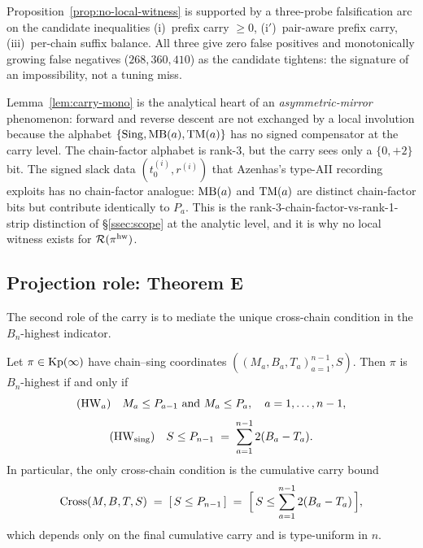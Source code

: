 Proposition~\ref{prop:no-local-witness} is supported by a three-probe falsification
arc on the candidate inequalities (i)~prefix carry $\ge 0$, (i$'$)~pair-aware
prefix carry, (iii)~per-chain suffix balance. All three give zero false positives
and monotonically growing false negatives ($268, 360, 410$) as the candidate
tightens: the signature of an impossibility, not a tuning miss.

\begin{remark}\label{rmk:asymmetric-mirror}
Lemma~\ref{lem:carry-mono} is the analytical heart of an
\emph{asymmetric-mirror} phenomenon: forward and
reverse descent are not exchanged by a local involution because the alphabet
$\{\mathrm{Sing}, \mathrm{MB}(a), \mathrm{TM}(a)\}$ has no signed compensator at the carry level. The
chain-factor alphabet is rank-3, but the carry sees only a $\{0, +2\}$ bit. The
signed slack data $(t_0^{(i)}, r^{(i)})$ that Azenhas's type-AII recording
exploits has no chain-factor analogue: $\mathrm{MB}(a)$ and $\mathrm{TM}(a)$ are distinct
chain-factor bits but contribute identically to $P_a$. This is the
rank-3-chain-factor-vs-rank-1-strip distinction of \S\ref{ssec:scope} at the
analytic level, and it is why no local witness exists for $\mathcal{R}(\pi^{\mathrm{hw}})$.
\end{remark}

\subsection{Projection role: Theorem E}\label{ssec:carry-cross}

The second role of the carry is to mediate the unique cross-chain condition in
the $B_n$-highest indicator.

\begin{theorem}\label{thm:carry-E}
Let $\pi \in \mathrm{Kp}(\infty)$ have chain--sing coordinates
$((M_a, B_a, T_a)_{a=1}^{n-1}, S)$. Then $\pi$ is $B_n$-highest if and only if
\[
   (\mathrm{HW}_a) \quad M_a \le P_{a-1}\ \text{and}\ M_a \le P_a, \quad a = 1, \dots, n-1,
\]
\[
   (\mathrm{HW}_{\mathrm{sing}}) \quad S \le P_{n-1} \;=\; \sum_{a=1}^{n-1} 2(B_a - T_a).
\]
In particular, the only cross-chain condition is the cumulative carry bound
\[
   \mathrm{Cross}(M, B, T, S) \;=\; [\,S \le P_{n-1}\,] \;=\; \Bigl[\, S \le \sum_{a=1}^{n-1} 2(B_a - T_a) \,\Bigr],
\]
which depends only on the final cumulative carry and is type-uniform in $n$.
\end{theorem}

